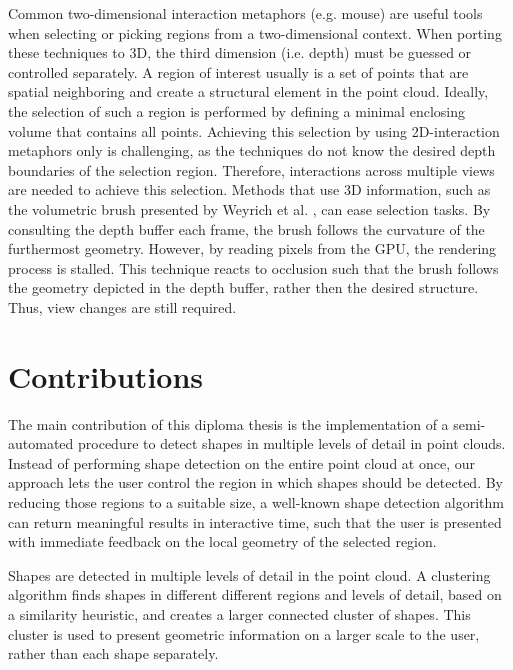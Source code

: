 \par

Common two-dimensional interaction metaphors (e.g. mouse) are useful tools when selecting or picking regions from a two-dimensional context. When porting these techniques to 3D, the third dimension (i.e. depth) must be guessed or controlled separately. A region of interest usually is a set of points that are spatial neighboring and create a structural element in the point cloud. Ideally, the selection of such a region is performed by defining a minimal enclosing volume that contains all points. Achieving this selection by using 2D-interaction metaphors only is challenging, as the techniques do not know the desired depth boundaries of the selection region. Therefore, interactions across multiple views are needed to achieve this selection. Methods that use 3D information, such as the volumetric brush presented by Weyrich et al. \cite{weyrich2004post}, can ease selection tasks. By consulting the depth buffer each frame, the brush follows the curvature of the furthermost geometry. However, by reading pixels from the GPU, the rendering process is stalled. This technique reacts to occlusion such that the brush follows the geometry depicted in the depth buffer, rather then the desired structure. Thus, view changes are still required.


\section{Contributions}

The main contribution of this diploma thesis is the implementation of a semi-automated procedure to detect shapes in multiple levels of detail in point clouds. Instead of performing shape detection on the entire point cloud at once, our approach lets the user control the region in which shapes should be detected. By reducing those regions to a suitable size, a well-known shape detection algorithm can return meaningful results in interactive time, such that the user is presented with immediate feedback on the local geometry of the selected region. 

\par

Shapes are detected in multiple levels of detail in the point cloud. A clustering algorithm finds shapes in different different regions and levels of detail, based on a similarity heuristic, and creates a larger connected cluster of shapes. This cluster is used to present geometric information on a larger scale to the user, rather than each shape separately. 

